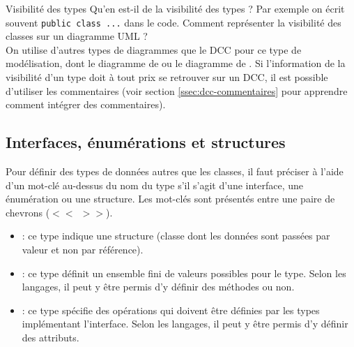 \begin{extra}{Visibilité des types}
	Qu'en est-il de la visibilité des types ? Par exemple on écrit souvent \texttt{public class ...} dans le code. Comment représenter la visibilité des classes sur un diagramme UML ?\\
	
	On utilise d'autres types de diagrammes que le \acrshort{DCC} pour ce type de modélisation, dont le diagramme de  ou le diagramme de . Si l'information de la visibilité d'un type doit à tout prix se retrouver sur un \acrshort{DCC}, il est possible d'utiliser les commentaires (voir section \ref{ssec:dcc-commentaires} pour apprendre comment intégrer des commentaires).
\end{extra}

\subsection{Interfaces, énumérations et structures}


Pour définir des types de données autres que les classes, il faut préciser à l'aide d'un mot-clé au-dessus du nom du type s'il s'agit d'une interface, une énumération ou une structure. Les mot-clés sont présentés entre une paire de chevrons ($<<\ \ >>$).

\begin{itemize}
	\item {} : ce type indique une structure (classe dont les données sont passées par valeur et non par référence).
	\item {} : ce type définit un ensemble fini de valeurs possibles pour le type. Selon les langages, il peut y être permis d'y définir des méthodes ou non.
	\item {} : ce type spécifie des opérations qui doivent être définies par les types implémentant l'interface. Selon les langages, il peut y être permis d'y définir des attributs.
\end{itemize}

